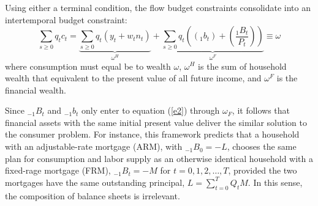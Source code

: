 \documentclass[11pt,letterpaper]{article}
\begin{document}
{Using either a terminal condition, the flow budget constraints consolidate into an intertemporal budget constraint: 
\begin{equation}\label{e2}
	\sum_{s \geqslant 0}q_{t}c_{t} = \underbrace{\sum_{s \geqslant 0}q_{t}(y_{t} + w_{t}n_{t})}_{\omega^H} + \underbrace{\sum_{s \geqslant 0}q_{t}\left ( (_{1}b_{t}) + \left(\frac{_{1}B_{t}}{P_{t}}\right)\right )}_{\omega^F} \equiv \omega 
\end{equation}
where consumption must equal be to wealth $\omega$, $\omega^{H}$  is the sum of household wealth that equivalent to the present value of all future income, and $\omega^{F}$ is the financial wealth. 





Since $_{-1}B_{t}$ and $_{-1}b_{t}$ only enter to equation (\ref{e2}) through $\omega_{F}$, it follows that financial assets with the same initial present value deliver the similar solution to the consumer problem. For instance, this framework predicts that a household with an adjustable-rate mortgage (ARM), with $_{-1}B_{0} = -L$, chooses the same plan for consumption and labor supply as an otherwise identical household with a fixed-rage mortgage (FRM), $_{-1}B_{t} = -M$ for $t = 0, 1, 2, \ldots, T$, provided the two mortgages have the same outstanding principal, $L = \sum_{t=0}^{T}Q_{t}M$. In this sense, the composition of balance sheets is irrelevant. 

}
\end{document}
